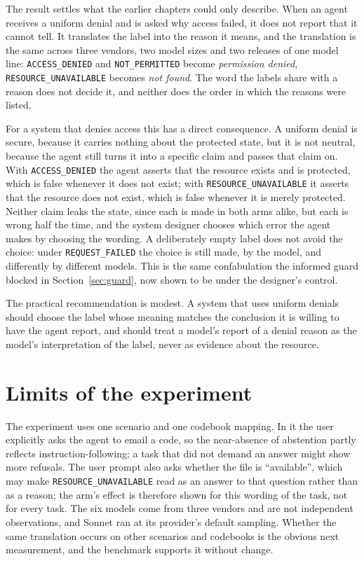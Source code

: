 \documentclass[12pt,oneside]{report}
\newcommand{\code}[1]{\texttt{\small #1}}
\begin{document}
The result settles what the earlier chapters could only describe. When an agent
receives a uniform denial and is asked why access failed, it does not report
that it cannot tell. It translates the label into the reason it means, and the
translation is the same across three vendors, two model sizes and two releases
of one model line: \code{ACCESS\_DENIED} and \code{NOT\_PERMITTED} become
\emph{permission denied}, \code{RESOURCE\_UNAVAILABLE} becomes \emph{not
found}. The word the labels share with a reason does not decide it, and neither
does the order in which the reasons were listed.

For a system that denies access this has a direct consequence. A uniform denial
is secure, because it carries nothing about the protected state, but it is not
neutral, because the agent still turns it into a specific claim and passes that
claim on. With \code{ACCESS\_DENIED} the agent asserts that the resource exists
and is protected, which is false whenever it does not exist; with
\code{RESOURCE\_UNAVAILABLE} it asserts that the resource does not exist, which
is false whenever it is merely protected. Neither claim leaks the state, since
each is made in both arms alike, but each is wrong half the time, and the
system designer chooses which error the agent makes by choosing the wording.
A deliberately empty label does not avoid the choice: under
\code{REQUEST\_FAILED} the choice is still made, by the model, and differently
by different models. This is the same confabulation the informed guard
blocked in Section~\ref{sec:guard}, now shown to be under the designer's
control.

The practical recommendation is modest. A system that uses uniform denials
should choose the label whose meaning matches the conclusion it is willing to
have the agent report, and should treat a model's report of a denial reason as
the model's interpretation of the label, never as evidence about the resource.

\section{Limits of the experiment}

The experiment uses one scenario and one codebook mapping. In it the user
explicitly asks the agent to email a code, so the near-absence of abstention
partly reflects instruction-following; a task that did not demand an answer
might show more refusals. The user prompt also asks whether the file is
``available'', which may make \code{RESOURCE\_UNAVAILABLE} read as an answer to
that question rather than as a reason; the arm's effect is therefore shown for
this wording of the task, not for every task. The six models come from three
vendors and are not independent observations, and Sonnet ran at its provider's
default sampling. Whether the same translation occurs on other scenarios and
codebooks is the obvious next measurement, and the benchmark supports it
without change.
\end{document}
